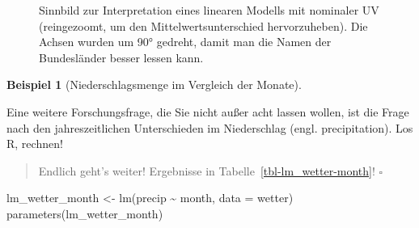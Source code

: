 \documentclass[
  letterpaper,
]{scrbook}
\newenvironment{Shaded}{\begin{snugshade}}{\end{snugshade}}
\newcommand{\AttributeTok}[1]{\textcolor[rgb]{0.40,0.45,0.13}{#1}}
\newcommand{\FunctionTok}[1]{\textcolor[rgb]{0.28,0.35,0.67}{#1}}
\newcommand{\NormalTok}[1]{\textcolor[rgb]{0.00,0.23,0.31}{#1}}
\newcommand{\OtherTok}[1]{\textcolor[rgb]{0.00,0.23,0.31}{#1}}
\newcommand{\SpecialCharTok}[1]{\textcolor[rgb]{0.37,0.37,0.37}{#1}}
\theoremstyle{definition}
\newtheorem{example}{Beispiel}[chapter]
\theoremstyle{definition}
\theoremstyle{definition}
\theoremstyle{remark}
\begin{document}
\begin{figure}


\caption{\label{fig-bin-nom}Sinnbild zur Interpretation eines linearen
Modells mit nominaler UV (reingezoomt, um den Mittelwertsunterschied
hervorzuheben). Die Achsen wurden um 90° gedreht, damit man die Namen
der Bundesländer besser lessen kann.}

\end{figure}%

\begin{example}[Niederschlagsmenge im Vergleich der
Monate]\protect\hypertarget{exm-months}{}\label{exm-months}

Eine weitere Forschungsfrage, die Sie nicht außer acht lassen wollen,
ist die Frage nach den jahreszeitlichen Unterschieden im Niederschlag
(engl. precipitation). Los R, rechnen!

\begin{quote}
{} Endlich geht's weiter! Ergebnisse in
Tabelle~\ref{tbl-lm_wetter-month}! \(\square\)
\end{quote}

\end{example}

\begin{Shaded}
\begin{Highlighting}[]
\NormalTok{lm\_wetter\_month }\OtherTok{\textless{}{-}} \FunctionTok{lm}\NormalTok{(precip }\SpecialCharTok{\textasciitilde{}}\NormalTok{ month, }\AttributeTok{data =}\NormalTok{ wetter)}
\FunctionTok{parameters}\NormalTok{(lm\_wetter\_month)}
\end{Highlighting}
\end{Shaded}
\end{document}
